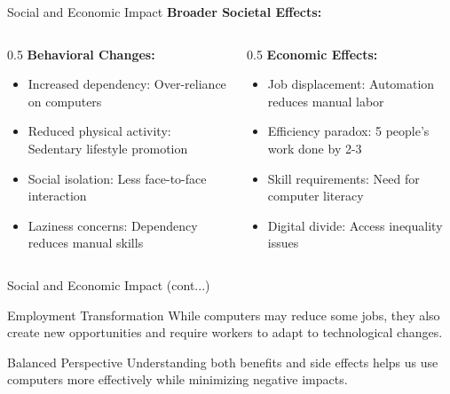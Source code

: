 \documentclass[aspectratio=169]{beamer}
\begin{document}
\begin{frame}{Social and Economic Impact}
    \textbf{Broader Societal Effects:}
    
    \begin{columns}
        \begin{column}{0.5\textwidth}
            \textbf{Behavioral Changes:}
            \begin{itemize}
                \item Increased dependency: Over-reliance on computers
                \item Reduced physical activity: Sedentary lifestyle promotion
                \item Social isolation: Less face-to-face interaction
                \item Laziness concerns: Dependency reduces manual skills
            \end{itemize}
        \end{column}
        \begin{column}{0.5\textwidth}
            \textbf{Economic Effects:}
            \begin{itemize}
                \item Job displacement: Automation reduces manual labor
                \item Efficiency paradox: 5 people's work done by 2-3
                \item Skill requirements: Need for computer literacy
                \item Digital divide: Access inequality issues
            \end{itemize}
        \end{column}
    \end{columns}
    
   
\end{frame}


\begin{frame}{Social and Economic Impact (cont...)}
 \begin{exampleblock}{Employment Transformation}
        While computers may reduce some jobs, they also create new opportunities and require workers to adapt to technological changes.
    \end{exampleblock}
    
    \begin{block}{Balanced Perspective}
        Understanding both benefits and side effects helps us use computers more effectively while minimizing negative impacts.
    \end{block}
\end{frame}
    
\end{document}

